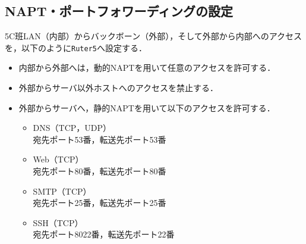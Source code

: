 \subsection{NAPT・ポートフォワーディングの設定}
5C班LAN（内部）からバックボーン（外部），そして外部から内部へのアクセスを，以下のように\texttt{Ruter5}へ設定する．
\begin{itemize}
    \item 内部から外部へは，動的NAPTを用いて任意のアクセスを許可する．
    \item 外部からサーバ以外ホストへのアクセスを禁止する．
    \item 外部からサーバへ，静的NAPTを用いて以下のアクセスを許可する．
          \begin{multicols}{2}
              \begin{itemize}
                  \item DNS（TCP，UDP）\\宛先ポート53番，転送先ポート53番
                  \item Web（TCP）\\宛先ポート80番，転送先ポート80番
                  \item SMTP（TCP）\\宛先ポート25番，転送先ポート25番
                  \item SSH（TCP）\\宛先ポート8022番，転送先ポート22番
              \end{itemize}
          \end{multicols}
\end{itemize}
